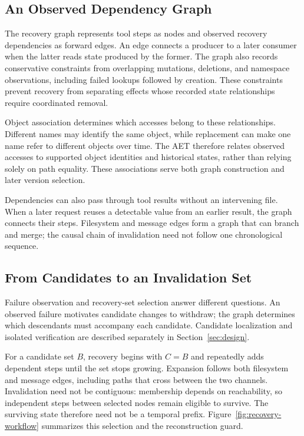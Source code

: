 \subsection{An Observed Dependency Graph}
\label{sec:effect-dag}

The recovery graph represents tool steps as nodes and observed recovery
dependencies as forward edges.
An edge connects a producer to a later consumer when the latter reads
state produced by the former.
The graph also records conservative constraints from overlapping mutations,
deletions, and namespace observations, including failed lookups followed by
creation.
These constraints prevent recovery from separating effects whose recorded
state relationships require coordinated removal.

Object association determines which accesses belong to these relationships.
Different names may identify the same object, while replacement can make one
name refer to different objects over time.
The AET therefore relates observed accesses to supported object identities
and historical states, rather than relying solely on path equality.
These associations serve both graph construction and later version selection.

Dependencies can also pass through tool results without an intervening file.
When a later request reuses a detectable value from an earlier result, the
graph connects their steps.
Filesystem and message edges form a graph that can branch and merge; the
causal chain of invalidation need not follow one chronological sequence.

\subsection{From Candidates to an Invalidation Set}
\label{sec:recovery-selection}

Failure observation and recovery-set selection answer different questions.
An observed failure motivates candidate changes to withdraw; the graph
determines which descendants must accompany each candidate.
Candidate localization and isolated verification are described separately
in Section~\ref{sec:design}.

For a candidate set $B$, recovery begins with $C=B$ and repeatedly adds
dependent steps until the set stops growing.
Expansion follows both filesystem and message edges, including paths that
cross between the two channels.
Invalidation need not be contiguous: membership depends on reachability,
so independent steps between selected nodes remain eligible to survive.
The surviving state therefore need not be a temporal prefix.
Figure~\ref{fig:recovery-workflow} summarizes this selection and the
reconstruction guard.

